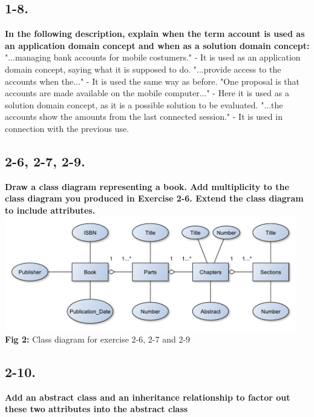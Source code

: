 \documentclass[12pt]{article}
\begin{document}
\subsection{1-8.}
\textbf{In the following description, explain when the term account is used as an application domain concept and when as a solution domain concept:}\\
"...managing bank accounts for mobile costumers." - It is used as an application domain concept, saying what it is supposed to do. 
"...provide access to the accounts when the..." - It is used the same way as before. 
"One proposal is that accounts are made available on the mobile computer..." - Here it is used as a solution domain concept, as it is a possible solution to be evaluated. 
"...the accounts show the amounts from the last connected session." - It is used in connection with the previous use.\\











\subsection{2-6, 2-7, 2-9.}
\textbf{Draw a class diagram representing a book. Add multiplicity to the class diagram you produced in Exercise 2-6. Extend the class diagram to include attributes.}\\

\includegraphics[height=50mm]{2-6}\\
\textbf{Fig 2:} Class diagram for exercise 2-6, 2-7 and 2-9








\newpage
\subsection{2-10.}
\textbf{Add an abstract class and an inheritance relationship to factor out these two attributes into the abstract class}\\
\end{document}
